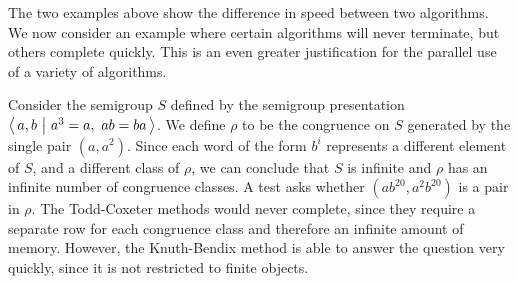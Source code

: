 The two examples above show the difference in speed between two algorithms.  We
now consider an example where certain algorithms will never terminate, but
others complete quickly.  This is an even greater justification for the parallel
use of a variety of algorithms.

\begin{example}
  \label{ex:good-kbfp}
  Consider the semigroup $S$ defined by the semigroup presentation
  $\left\langle\,a,b ~\middle|~ a^3=a,\ ab=ba\,\right\rangle$.  We define $\rho$ to be the congruence on $S$
  generated by the single pair $(a, a^2)$.  Since each word of the form $b^i$
  represents a different element of $S$, and a different class of $\rho$, we can
  conclude that $S$ is infinite and $\rho$ has an infinite number of congruence
  classes.  A test asks whether $(ab^{20}, a^2b^{20})$ is a pair in $\rho$.  The
  Todd-Coxeter methods would never complete, since they require a separate row
  for each congruence class and therefore an infinite amount of memory.
  However, the Knuth-Bendix method is able to answer the question very quickly,
  since it is not restricted to finite objects.
\end{example}





